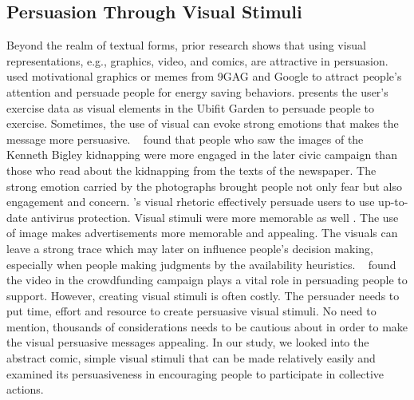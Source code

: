 \subsection{Persuasion Through Visual Stimuli}
Beyond the realm of textual forms, prior research shows that using visual representations, e.g., graphics, video, and comics, are attractive in persuasion. ~\textcite{selker2015sweetbuildinggreeter} used motivational graphics or memes from 9GAG and Google to attract people's attention and persuade people for energy saving behaviors. \textcite{consolvo2008activity} presents the user's exercise data as visual elements in the Ubifit Garden to persuade people to exercise. Sometimes, the use of visual can evoke strong emotions that makes the message more persuasive. ~\textcite{iyer2006picture} found that people who saw the images of the Kenneth Bigley kidnapping were more engaged in the later civic campaign than those who read about the kidnapping from the texts of the newspaper. The strong emotion carried by the photographs brought people not only fear but also engagement and concern. \textcite{zhang2014stop}'s visual rhetoric effectively persuade users to use up-to-date antivirus protection. Visual stimuli were more memorable as well \cite{nisbett1980human}. The use of image makes advertisements more memorable and appealing. The visuals can leave a strong trace which may later on influence people's decision making, especially when people making judgments by the availability heuristics. ~\textcite{dey2017art} found the video in the crowdfunding campaign plays a vital role in persuading people to support. However, creating visual stimuli is often costly. The persuader needs to put time, effort and resource to create persuasive visual stimuli. No need to mention, thousands of considerations needs to be cautious about in order to make the visual persuasive messages appealing. In our study, we looked into the abstract comic, simple visual stimuli that can be made relatively easily and examined its persuasiveness in encouraging people to participate in collective actions. 








